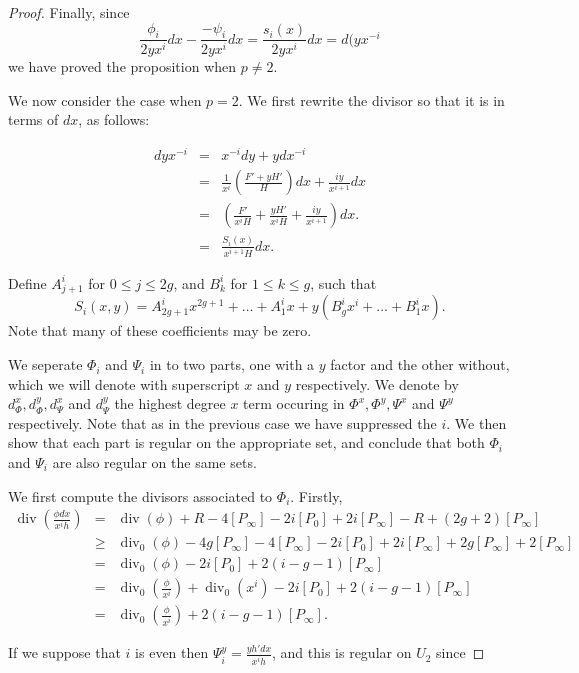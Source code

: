 \documentclass[draft, 11pt]{article} %
\theoremstyle{plain}
\theoremstyle{remark}
\DeclareMathOperator{\di}{div}
\begin{document}
\begin{proof}
Finally, since 
\[ 
\frac{\phi_i}{2yx^i}dx - \frac{-\psi_i}{2yx^i}dx = \frac{s_i(x)}{2yx^i}dx = d(yx^{-i}
\]
we have proved the proposition when $p\neq 2$.

We now consider the case when $p=2$.
We first rewrite the divisor so that it is in terms of $dx$, as follows:

\begin{eqnarray*}
dyx^{-i} & = & x^{-i}dy + ydx^{-i} \\
& = & \frac{1}{x^i} \left( \frac{F' + yH'}{H}\right) dx + \frac{iy}{x^{i+1}}dx \\
& = & \left( \frac{F'}{x^iH} + \frac{yH'}{x^iH} + \frac{iy}{x^{i+1}} \right) dx.\\
& = & \frac{S_i(x)}{x^{i+1}H}dx.
\end{eqnarray*}

Define $A^i_{j+1}$ for $0 \leq j \leq 2g$, and $B_k^i$ for $1\leq k \leq g$, such that
\[
	S_i(x,y) = A_{2g+1}^ix^{2g+1} + \ldots + A^i_1 x + y(B_g^i x^i + \ldots + B_1^i x).
\]
Note that many of these coefficients may be zero.

We seperate $\Phi_i$ and $\Psi_i$ in to two parts, one with a $y$ factor and the other without, which we will denote with superscript $x$ and $y$ respectively.
We denote by $d^x_\Phi, d^y_\Phi, d^x_\Psi$ and $d^y_\Psi$ the highest degree $x$ term occuring in $\Phi^x, \Phi^y, \Psi^x$ and $\Psi^y$ respectively.
Note that as in the previous case we have suppressed the $i$.
We then show that each part is regular on the appropriate set, and conclude that both $\Phi_i$ and $\Psi_i$ are also regular on the same sets.

We first compute the divisors associated to $\Phi_i$.
Firstly, 
\begin{eqnarray*}
\di \left( \frac{\phi dx}{x^i h} \right) & = & \di(\phi) + R - 4[P_\infty] - 2i[P_0] + 2i[P_\infty] - R + (2g+2) [P_\infty] \\
& \geq & \di_0(\phi) - 4g[P_\infty] - 4[P_\infty] - 2i[P_0] + 2i[P_\infty] + 2g[P_\infty] + 2[P_\infty] \\
& = & \di_0(\phi) - 2i[P_0] + 2(i-g-1)[P_\infty] \\
& = & \di_0\left( \frac{\phi}{x^i} \right) + \di_0( x^i) - 2i[P_0] + 2(i-g-1)[P_\infty] \\
& = & \di_0 \left( \frac{\phi}{x^i} \right) + 2(i-g-1)[P_\infty].
\end{eqnarray*}

If we suppose that $i$ is even then $\Psi_i^y = \frac{yh'dx}{x^ih}$, and this is regular on $U_2$ since


\end{proof}
\end{document}
